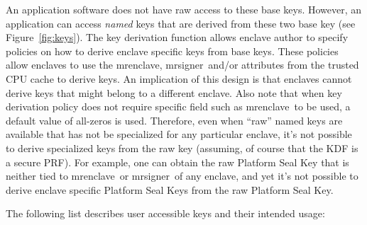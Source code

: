 \documentclass[10pt, letterpaper]{article}
\newcommand{\mrenclave}{\textsf{mrenclave}}
\newcommand{\mrsigner}{\textsf{mrsigner}}
\begin{document}
  An application software does not have raw access to these base
  keys. However, an application can access \textit{named} keys that
  are derived from these two base key (see Figure~\ref{fig:keys}).
  The key derivation function allows enclave author to specify
  policies on how to derive enclave specific keys from base
  keys. These policies allow enclaves to use the \mrenclave,
  \mrsigner\ and/or attributes from the trusted CPU cache to derive
  keys. An implication of this design is that enclaves cannot derive
  keys that might belong to a different enclave. Also note that when
  key derivation policy does not require specific field such as
  \mrenclave\ to be used, a default value of all-zeros is
  used. Therefore, even when ``raw'' named keys are available that has
  not be specialized for any particular enclave, it's not possible to
  derive specialized keys from the raw key (assuming, of course that
  the KDF is a secure PRF). For example, one can obtain the raw
  Platform Seal Key that is neither tied to \mrenclave\ or
  \mrsigner\ of any enclave, and yet it's not possible to derive
  enclave specific Platform Seal Keys from the raw Platform Seal Key.

  The following list describes user accessible keys and their intended
  usage:
\end{document}
